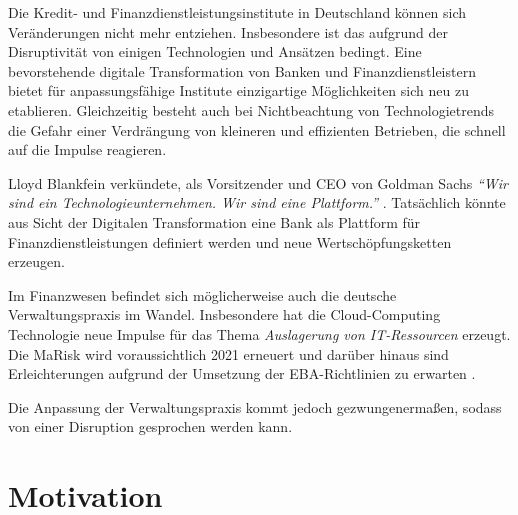 Die Kredit- und Finanzdienstleistungsinstitute in Deutschland können sich Veränderungen nicht mehr entziehen. Insbesondere ist das aufgrund der Disruptivität von einigen Technologien und Ansätzen bedingt. Eine bevorstehende digitale Transformation von Banken und Finanzdienstleistern bietet für anpassungsfähige Institute einzigartige Möglichkeiten sich neu zu etablieren. Gleichzeitig besteht auch bei Nichtbeachtung von Technologietrends die Gefahr einer Verdrängung von kleineren und effizienten Betrieben, die schnell auf die Impulse reagieren.

Lloyd Blankfein verkündete, als Vorsitzender und \ac{CEO} von Goldman Sachs \emph{\enquote{Wir sind ein Technologieunternehmen. Wir sind eine Plattform.}} \cite{Gupta:2017}. Tatsächlich könnte aus Sicht der Digitalen Transformation eine Bank als Plattform für Finanzdienstleistungen definiert werden und neue Wertschöpfungsketten erzeugen. 

Im Finanzwesen befindet sich möglicherweise auch die deutsche Verwaltungspraxis im Wandel. Insbesondere hat die Cloud-Computing Technologie neue Impulse für das Thema \emph{Auslagerung von IT-Ressourcen\cite{MaRisk:2017, BAIT:2018}} erzeugt. Die MaRisk wird voraussichtlich 2021 erneuert und darüber hinaus sind Erleichterungen aufgrund der Umsetzung der EBA-Richtlinien zu erwarten \cite{BaFin:marisk-novelle}.

Die Anpassung der Verwaltungspraxis kommt jedoch gezwungenermaßen, sodass von einer Disruption gesprochen werden kann.
%
%
\section{Motivation}
\label{sec:intro:motivation}

